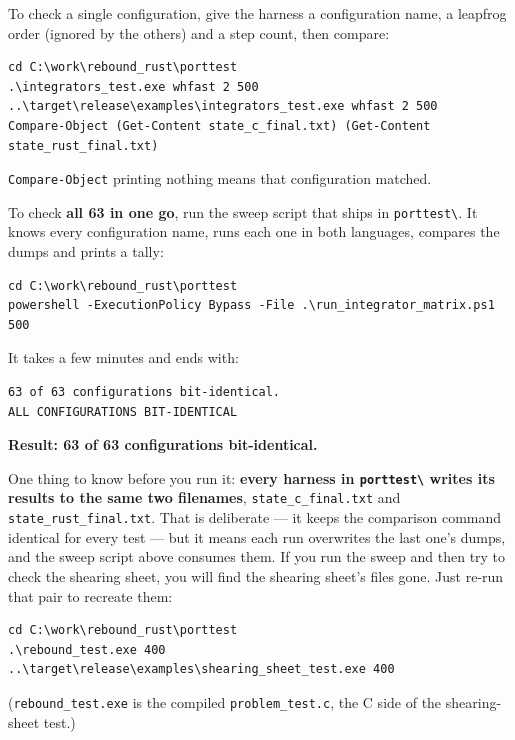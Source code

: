 \documentclass[11pt]{article}
\begin{document}
To check a single configuration, give the harness a configuration name, a leapfrog order (ignored by the others) and a step count, then compare:

\begin{lstlisting}
cd C:\work\rebound_rust\porttest
.\integrators_test.exe whfast 2 500
..\target\release\examples\integrators_test.exe whfast 2 500
Compare-Object (Get-Content state_c_final.txt) (Get-Content state_rust_final.txt)
\end{lstlisting}

\texttt{Compare-Object} printing nothing means that configuration matched.

To check \textbf{all 63 in one go}, run the sweep script that ships in \texttt{porttest\textbackslash{}}. It knows every configuration name, runs each one in both languages, compares the dumps and prints a tally:

\begin{lstlisting}
cd C:\work\rebound_rust\porttest
powershell -ExecutionPolicy Bypass -File .\run_integrator_matrix.ps1 500
\end{lstlisting}

It takes a few minutes and ends with:

\begin{lstlisting}
63 of 63 configurations bit-identical.
ALL CONFIGURATIONS BIT-IDENTICAL
\end{lstlisting}

\textbf{Result: 63 of 63 configurations bit-identical.}

One thing to know before you run it: \textbf{every harness in \texttt{porttest\textbackslash{}} writes its results to the same two filenames}, \texttt{state\_c\_final.txt} and \texttt{state\_rust\_final.txt}. That is deliberate --- it keeps the comparison command identical for every test --- but it means each run overwrites the last one's dumps, and the sweep script above consumes them. If you run the sweep and then try to check the shearing sheet, you will find the shearing sheet's files gone. Just re-run that pair to recreate them:

\begin{lstlisting}
cd C:\work\rebound_rust\porttest
.\rebound_test.exe 400
..\target\release\examples\shearing_sheet_test.exe 400
\end{lstlisting}

(\texttt{rebound\_test.exe} is the compiled \texttt{problem\_test.c}, the C side of the shearing-sheet test.)
\end{document}
